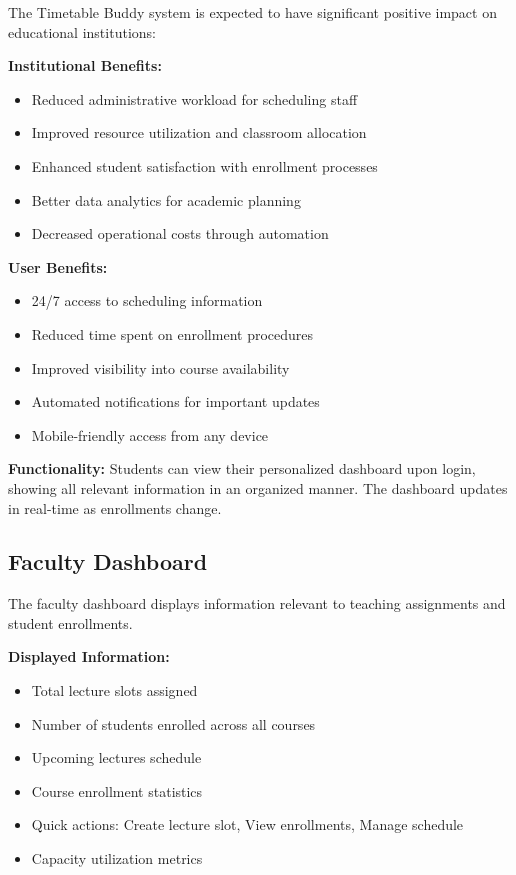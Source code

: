 The Timetable Buddy system is expected to have significant positive impact on educational institutions:

\textbf{Institutional Benefits:}
\begin{itemize}[leftmargin=*]
    \item Reduced administrative workload for scheduling staff
    \item Improved resource utilization and classroom allocation
    \item Enhanced student satisfaction with enrollment processes
    \item Better data analytics for academic planning
    \item Decreased operational costs through automation
\end{itemize}

\textbf{User Benefits:}
\begin{itemize}[leftmargin=*]
    \item 24/7 access to scheduling information
    \item Reduced time spent on enrollment procedures
    \item Improved visibility into course availability
    \item Automated notifications for important updates
    \item Mobile-friendly access from any device
\end{itemize}

\textbf{Functionality:} Students can view their personalized dashboard upon login, showing all relevant information in an organized manner. The dashboard updates in real-time as enrollments change.

\subsection{Faculty Dashboard}
The faculty dashboard displays information relevant to teaching assignments and student enrollments.

\textbf{Displayed Information:}
\begin{itemize}
    \item Total lecture slots assigned
    \item Number of students enrolled across all courses
    \item Upcoming lectures schedule
    \item Course enrollment statistics
    \item Quick actions: Create lecture slot, View enrollments, Manage schedule
    \item Capacity utilization metrics
\end{itemize}

